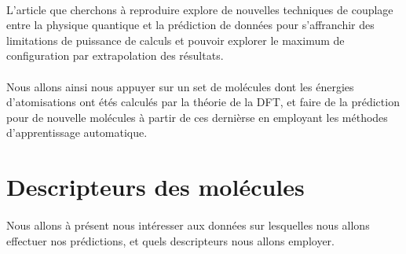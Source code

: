 \documentclass[a4paper,12pt,titlepage]{report}
\begin{document}
\paragraph{}
L'article que cherchons à reproduire explore de nouvelles techniques de couplage entre la physique quantique et la prédiction de données pour s'affranchir des limitations de puissance de calculs et pouvoir explorer le maximum de configuration par extrapolation des résultats. \\
\paragraph{}
Nous allons ainsi nous appuyer sur un set de molécules dont les énergies d'atomisations ont étés calculés par la théorie de la DFT, et faire de la prédiction pour de nouvelle molécules à partir de ces dernièrse en employant les méthodes d'apprentissage automatique.

\newpage
\section{Descripteurs des molécules}

\paragraph{}
Nous allons à présent nous intéresser aux données sur lesquelles nous allons effectuer nos prédictions, et quels descripteurs nous allons employer.
\end{document}
